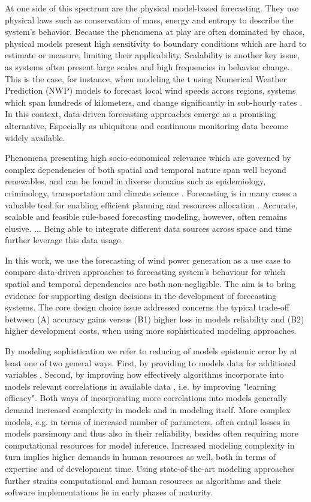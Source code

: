 At one side of this spectrum are the physical model-based forecasting.
They use physical laws such as conservation of mass, energy and entropy to describe the system's behavior.
Because the phenomena at play are often dominated by chaos, physical models present high sensitivity to boundary conditions which are hard to estimate or measure, limiting their applicability.
Scalability is another key issue, as systems often present large scales and high frequencies in behavior change.
This is the case, for instance, when modeling the t using Numerical Weather Prediction (NWP) models to forecast local wind speeds across regions, systems which span hundreds of kilometers, and change significantly in sub-hourly rates \cite{}.
In this context, data-driven forecasting approaches emerge as a promising alternative, Especially as ubiquitous and continuous monitoring data become widely available.

Phenomena presenting high socio-economical relevance which are governed by complex dependencies of both spatial and temporal nature span well beyond renewables, and can be found in diverse domains such as epidemiology, criminology, transportation and climate science \cite{atluri2018datamining}.
Forecasting is in many cases a valuable tool for enabling efficient planning and resources allocation \cite{armstrong2002principles}.
Accurate, scalable and feasible rule-based forecasting modeling, however, often remains elusive.
...
Being able to integrate different data sources across space and time further leverage this data usage.

In this work, we use the forecasting of wind power generation as a use case to compare data-driven approaches to forecasting system's behaviour for which spatial and temporal dependencies are both non-negligible.
The aim is to bring evidence for supporting design decisions in the development of forecasting systems.
The core design choice issue addressed concerns the typical trade-off between (A) accuracy gains versus (B1) higher loss in  models reliability and (B2) higher development costs, when using more sophisticated modeling approaches.

By modeling sophistication we refer to reducing of models epistemic error by at least one of two general ways.
First, by providing to models data for additional variables \cite{hüllermeier2020aleatoric}.
Second, by improving how effectively algorithms incorporate into models relevant correlations in available data \cite{hüllermeier2020aleatoric}, i.e. by improving "learning efficacy".
Both ways of incorporating more correlations into models generally demand increased complexity in models and in modeling itself.
More complex models, e.g. in terms of increased number of parameters, often entail losses in models parsimony and thus also in their reliability, besides often requiring more computational resources for model inference.
Increased modeling complexity in turn implies higher demands in human resources as well, both in terms of expertise and of development time.
Using state-of-the-art modeling approaches further strains computational and human resources as algorithms and their software implementations lie in early phases of maturity.


